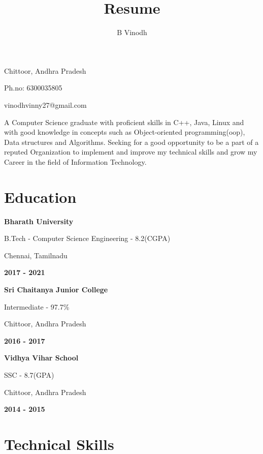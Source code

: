 \documentclass[11pt]{article}
\makeatletter
\renewcommand{\maketitle}{
  \begin{multicols}{2}
  {\huge \bfseries
  \theauthor}

  Chittoor, Andhra Pradesh
\columnbreak{}

\hspace*{\fill}Ph.no: 6300035805

\hspace*{\fill}vinodhvinny27@gmail.com
  \end{multicols}
}
\makeatother
\begin{document}
\title{Resume}
\author{B Vinodh}
\maketitle

A Computer Science graduate with proficient skills in C++, Java, Linux and with
good knowledge in concepts such as Object-oriented programming(oop), Data structures
and Algorithms. Seeking for a good opportunity to be a part of a reputed Organization
to implement and improve my technical skills and grow my Career in the field of
Information Technology.

\section{Education}
\begin{itemize}[leftmargin=1mm]
\begin{multicols}{2}
\item[] {\bfseries\large Bharath University}

	B.Tech {-} Computer Science Engineering {-} 8.2(CGPA)

  Chennai, Tamilnadu

\columnbreak{}
\hspace*{\fill} \bfseries{2017 {-} 2021}
\end{multicols}

\begin{multicols}{2}
\item[] {\bfseries\large Sri Chaitanya Junior College}

  Intermediate {-} 97.7\%

  Chittoor, Andhra Pradesh

\columnbreak{}
\hspace*{\fill} \bfseries{2016 {-} 2017}
\end{multicols}

\begin{multicols}{2}
\item[] {\bfseries\large Vidhya Vihar School}

  SSC {-} 8.7(GPA)

  Chittoor, Andhra Pradesh

\columnbreak{}
\hspace*{\fill}  \bfseries{2014 {-} 2015}
\end{multicols}

\end{itemize}

\section{Technical Skills}
\end{document}
